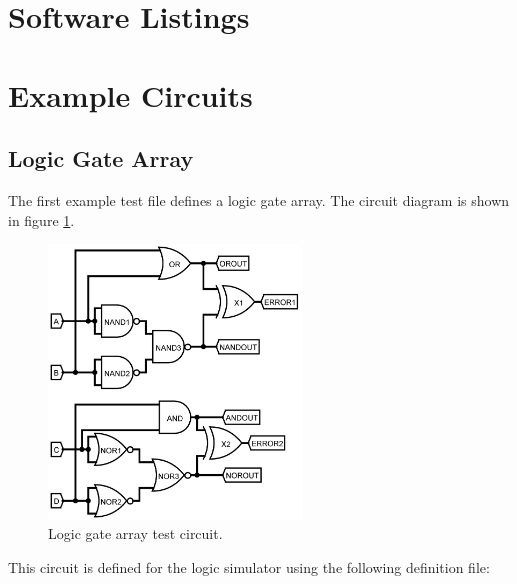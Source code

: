 \documentclass[a4paper,10pt]{article}  %
\begin{document}
\appendix

\section{Software Listings}
\label{sec:software-listings}

\section{Example Circuits}
\label{sec:example-circuits}

\subsection{Logic Gate Array}

The first example test file defines a logic gate array. The circuit
diagram is shown in figure \ref{fig:testlgcct}.
\begin{figure}[!htb]
  \begin{center}
    \includegraphics[width=0.6\textwidth]{testgates_schem.png}
  \end{center}
  \caption{Logic gate array test circuit.}
  \label{fig:testlgcct}
\end{figure}
This circuit is defined for the logic simulator using the following
definition file:

\end{document}
